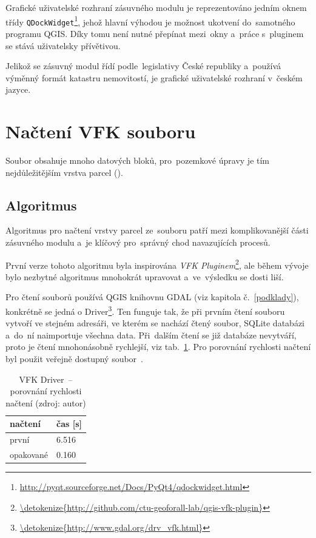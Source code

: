 Grafické uživatelské rozhraní zásuvného modulu je reprezentováno
jedním oknem třídy
\texttt{QDockWidget}\footnote{\url{http://pyqt.sourceforge.net/Docs/PyQt4/qdockwidget.html}},
jehož hlavní výhodou je možnost ukotvení do~samotného programu
QGIS. Díky tomu není nutné přepínat mezi~okny a~práce s~pluginem se
stává uživatelsky přívětivou.

Jelikož se zásuvný modul řídí podle~legislativy České republiky
a~používá vý\-měnný formát katastru nemovitostí, je grafické
uživatelské rozhraní v~českém jazyce.

\section{Načtení VFK souboru}
\label{nacteni_vfk}

Soubor  obsahuje mnoho datových bloků, pro~pozemkové úpravy je
tím nej\-důležitějším vrstva parcel (\texttt{}).

\subsection{Algoritmus}
\label{nacteni_vfk_algoritmus}

Algoritmus pro načtení vrstvy parcel ze~souboru  patří mezi
komplikovanější části zásuvného modulu a~je klíčový pro~správný chod
navazujících procesů.

První verze tohoto algoritmu byla inspirována \textit{VFK
Pluginem}\footnote{\url{\detokenize{http://github.com/ctu-geoforall-lab/qgis-vfk-plugin}}},
ale během vývoje bylo nezbytné algoritmus mnohokrát upravovat
a~ve~výsledku se dosti liší.

Pro čtení  souborů používá QGIS knihovnu GDAL (viz kapitola
č.~\ref{podklady}), konkrétně se jedná o 
Driver\footnote{\url{\detokenize{http://www.gdal.org/drv_vfk.html}}}. Ten
funguje tak, že při prvním čtení souboru vytvoří ve stejném adresáři,
ve kterém se nachází čtený  soubor, SQLite databázi a~do~ní
naimportuje všechna data. Při~dalším čtení se již databáze nevytváří,
proto je čtení mnohonásobně rychlejší, viz
tab.~\ref{tab:nacteni_vfk_driver}. Pro porovnání rychlosti načtení byl
použit veřejně dostupný  soubor~\citep{zdroj_vfk}.

\begin{table}[H]
    \begin{tabular}{|l|l|} \hline načtení & čas [s] \\ \hline \hline
první & 6.516 \\ \hline opakované & 0.160 \\ \hline
    \end{tabular} \centering
    \caption[VFK Driver~– porovnání rychlosti načtení]{VFK
Driver~– porovnání rychlosti načtení (zdroj: autor)}
    \label{tab:nacteni_vfk_driver}
\end{table}

